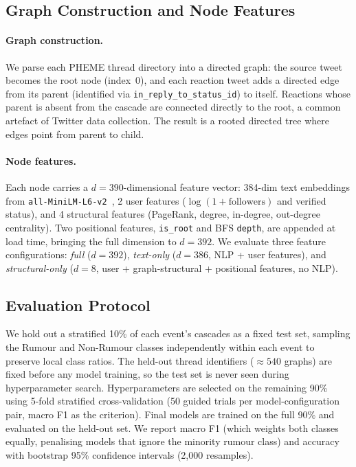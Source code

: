 \documentclass[runningheads]{llncs}
\begin{document}
\subsection{Graph Construction and Node Features}

\paragraph{Graph construction.}
We parse each PHEME thread directory into a directed graph: the source tweet
becomes the root node (index~0), and each reaction tweet adds a directed edge
from its parent (identified via \texttt{in\_reply\_to\_status\_id}) to itself.
Reactions whose parent is absent from the cascade are connected directly to the
root, a common artefact of Twitter data collection. The result is a rooted
directed tree where edges point from parent to child.

\paragraph{Node features.}
Each node carries a $d = 390$-dimensional feature vector: 384-dim text
embeddings from \texttt{all-MiniLM-L6-v2}~\cite{reimers2019sbert},
2 user features ($\log(1{+}\text{followers})$ and verified status), and
4 structural features (PageRank, degree, in-degree, out-degree centrality).
Two positional features, \texttt{is\_root} and BFS \texttt{depth}, are
appended at load time, bringing the full dimension to $d = 392$. We evaluate
three feature configurations: \textit{full} ($d = 392$), \textit{text-only}
($d = 386$, NLP + user features), and \textit{structural-only} ($d = 8$,
user + graph-structural + positional features, no NLP).

\subsection{Evaluation Protocol}

We hold out a stratified 10\% of each event's cascades as a fixed test set,
sampling the Rumour and Non-Rumour classes independently within each event to
preserve local class ratios. The held-out thread identifiers ($\approx 540$
graphs) are fixed before any model training, so the test set is never seen
during hyperparameter search. Hyperparameters are selected on the remaining
90\% using 5-fold stratified cross-validation (50 guided trials per
model-configuration pair, macro F1 as the criterion). Final models are trained
on the full 90\% and evaluated on the held-out set. We report macro F1 (which weights both classes equally, penalising models
that ignore the minority rumour class) and accuracy with bootstrap 95\%
confidence intervals (2{,}000 resamples).
\end{document}
